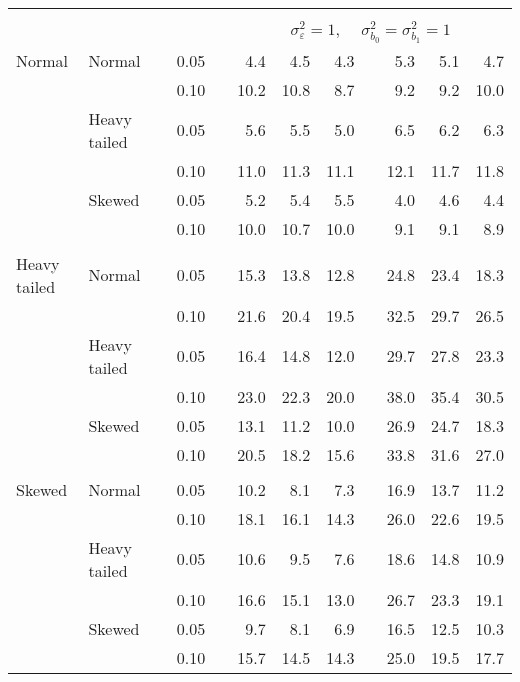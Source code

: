 \begin{table}[ht]
\begin{scriptsize}
\begin{tabular}{ll p{.1cm} c p{.1cm} rrr p{.1cm} rrr}
&&&&&&&&&&&\\
& && && \multicolumn{7}{c}{$\sigma_{\varepsilon}^2 = 1$, \ \ $\sigma_{b_0}^2 = \sigma_{b_1}^2 = 1$} \\ \cline{6-12}
\rowcolor{gray!20} Normal & Normal &  & 0.05 &  & 4.4 & 4.5 & 4.3 &  & 5.3 & 5.1 & 4.7 \\ 
\rowcolor{gray!20}    &  &  & 0.10 &  & 10.2 & 10.8 & 8.7 &  & 9.2 & 9.2 & 10.0 \\ 
\rowcolor{gray!20}    & Heavy tailed &  & 0.05 &  & 5.6 & 5.5 & 5.0 &  & 6.5 & 6.2 & 6.3 \\  
\rowcolor{gray!20}    &  &  & 0.10 &  & 11.0 & 11.3 & 11.1 &  & 12.1 & 11.7 & 11.8 \\ 
\rowcolor{gray!20}    & Skewed &  & 0.05 &  & 5.2 & 5.4 & 5.5 &  & 4.0 & 4.6 & 4.4 \\ 
\rowcolor{gray!20}    &  &  & 0.10 &  & 10.0 & 10.7 & 10.0 &  & 9.1 & 9.1 & 8.9 \\ 
&&&&&&&&&&&\\
  Heavy tailed & Normal &  & 0.05 &  & 15.3 & 13.8 & 12.8 &  & 24.8 & 23.4 & 18.3 \\ 
   &  &  & 0.10 &  & 21.6 & 20.4 & 19.5 &  & 32.5 & 29.7 & 26.5 \\ 
   & Heavy tailed &  & 0.05 &  & 16.4 & 14.8 & 12.0 &  & 29.7 & 27.8 & 23.3 \\ 
   &  &  & 0.10 &  & 23.0 & 22.3 & 20.0 &  & 38.0 & 35.4 & 30.5 \\ 
   & Skewed &  & 0.05 &  & 13.1 & 11.2 & 10.0 &  & 26.9 & 24.7 & 18.3 \\ 
   &  &  & 0.10 &  & 20.5 & 18.2 & 15.6 &  & 33.8 & 31.6 & 27.0 \\ 
&&&&&&&&&&&\\
  Skewed & Normal &  & 0.05 &  & 10.2 & 8.1 & 7.3 &  & 16.9 & 13.7 & 11.2 \\ 
   &  &  & 0.10 &  & 18.1 & 16.1 & 14.3 &  & 26.0 & 22.6 & 19.5 \\ 
   & Heavy tailed &  & 0.05 &  & 10.6 & 9.5 & 7.6 &  & 18.6 & 14.8 & 10.9 \\ 
   &  &  & 0.10 &  & 16.6 & 15.1 & 13.0 &  & 26.7 & 23.3 & 19.1 \\ 
   & Skewed &  & 0.05 &  & 9.7 & 8.1 & 6.9 &  & 16.5 & 12.5 & 10.3 \\ 
   &  &  & 0.10 &  & 15.7 & 14.5 & 14.3 &  & 25.0 & 19.5 & 17.7 \\ 


\end{tabular}
\end{scriptsize}
\end{table}
